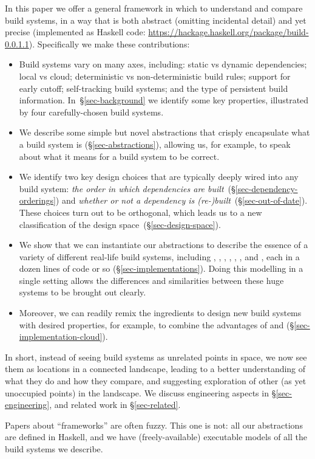 In this paper we offer a general framework in which to understand
and compare build systems,
in a way that is both abstract (omitting incidental detail)
and yet precise (implemented as Haskell code:
\url{https://hackage.haskell.org/package/build-0.0.1.1}). Specifically we make
these contributions:
\begin{itemize}
\item Build systems vary on many axes, including: static vs dynamic
  dependencies; local vs cloud; deterministic vs non-deterministic build rules;
  support for early cutoff; self-tracking build systems; and the type of
  persistent build information. In~\S\ref{sec-background} we identify some key
  properties, illustrated by four carefully-chosen build systems.

\item We describe some simple but novel abstractions that
  crisply encapsulate what a build system is (\S\ref{sec-abstractions}),
  allowing us, for example, to speak about what it means for a build system to be correct.

\item We identify two key design choices that are typically deeply wired into
  any build system: \emph{the order in which dependencies are
  built}~(\S\ref{sec-dependency-orderings}) and \emph{whether or not a
  dependency is (re-)built}~(\S\ref{sec-out-of-date}). These choices turn out to
  be orthogonal, which leads us to a new classification of the design
  space~(\S\ref{sec-design-space}).

\item We show that we can instantiate our abstractions to describe the essence
of a variety of different real-life build systems, including \Make, \Shake,
\Bazel, \CloudBuild, \Buck, \Nix, and \Excel, each in a dozen lines of code
or so (\S\ref{sec-implementations}). Doing this modelling in a single setting
allows the differences and similarities between these huge systems to be
brought out clearly.

\item Moreover, we can readily remix the ingredients to design new build systems
with desired properties, for example, to combine the advantages of \Shake and
\Bazel (\S\ref{sec-implementation-cloud}).

\end{itemize}
In short, instead of seeing build systems as unrelated
points in space, we now see them as locations in a connected landscape,
leading to a better understanding of what they do and how they compare,
and suggesting exploration of other (as yet unoccupied points) in the
landscape.
We discuss engineering aspects in \S\ref{sec-engineering}, and related
work in \S\ref{sec-related}.

Papers about ``frameworks'' are often fuzzy.  This one is not: all our
abstractions are defined in Haskell, and we have (freely-available)
executable models of all the build systems we describe.

